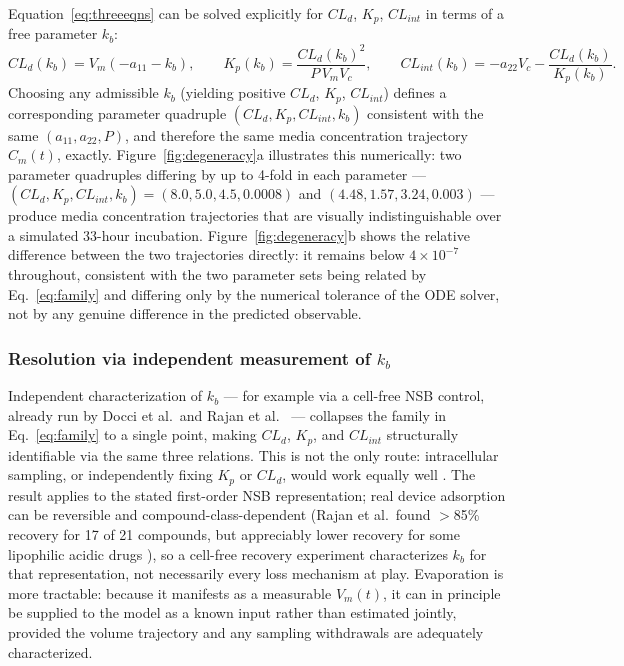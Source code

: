 Equation~\eqref{eq:threeeqns} can be solved explicitly for $CL_d$, $K_p$, $CL_{int}$ in terms of a free parameter $k_b$:
\begin{equation}
CL_d(k_b) = V_m(-a_{11}-k_b), \qquad K_p(k_b) = \frac{CL_d(k_b)^2}{P\,V_m V_c}, \qquad CL_{int}(k_b) = -a_{22}V_c - \frac{CL_d(k_b)}{K_p(k_b)}. \label{eq:family}
\end{equation}
Choosing any admissible $k_b$ (yielding positive $CL_d$, $K_p$, $CL_{int}$) defines a corresponding parameter quadruple $(CL_d, K_p, CL_{int}, k_b)$ consistent with the same $(a_{11}, a_{22}, P)$, and therefore the same media concentration trajectory $C_m(t)$, exactly. Figure~\ref{fig:degeneracy}a illustrates this numerically: two parameter quadruples differing by up to 4-fold in each parameter --- $(CL_d, K_p, CL_{int}, k_b) = (8.0, 5.0, 4.5, 0.0008)$ and $(4.48, 1.57, 3.24, 0.003)$ --- produce media concentration trajectories that are visually indistinguishable over a simulated 33-hour incubation. Figure~\ref{fig:degeneracy}b shows the relative difference between the two trajectories directly: it remains below $4\times10^{-7}$ throughout, consistent with the two parameter sets being related by Eq.~\eqref{eq:family} and differing only by the numerical tolerance of the ODE solver, not by any genuine difference in the predicted observable.

\subsubsection*{Resolution via independent measurement of $k_b$}

Independent characterization of $k_b$ --- for example via a cell-free NSB control, already run by Docci et al.\ and Rajan et al.\ \citep{docci2022,rajan2023} --- collapses the family in Eq.~\eqref{eq:family} to a single point, making $CL_d$, $K_p$, and $CL_{int}$ structurally identifiable via the same three relations. This is not the only route: intracellular sampling, or independently fixing $K_p$ or $CL_d$, would work equally well \citep{milani2024}. The result applies to the stated first-order NSB representation; real device adsorption can be reversible and compound-class-dependent (Rajan et al.\ found $>$85\% recovery for 17 of 21 compounds, but appreciably lower recovery for some lipophilic acidic drugs \citep{rajan2023}), so a cell-free recovery experiment characterizes $k_b$ for that representation, not necessarily every loss mechanism at play. Evaporation is more tractable: because it manifests as a measurable $V_m(t)$, it can in principle be supplied to the model as a known input rather than estimated jointly, provided the volume trajectory and any sampling withdrawals are adequately characterized.

